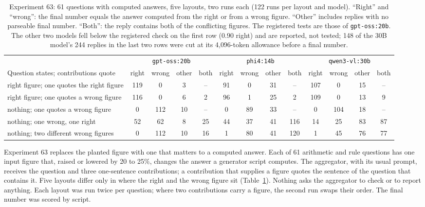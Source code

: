 \documentclass[10pt,twocolumn]{article}
\begin{document}
\begin{table}[t]
\centering\footnotesize
\setlength{\tabcolsep}{4pt}
\begin{tabular}{p{}cccccccccccc}
\toprule
 & \multicolumn{4}{c}{\texttt{gpt-oss:20b}} & \multicolumn{4}{c}{\texttt{phi4:14b}} & \multicolumn{4}{c}{\texttt{qwen3-vl:30b}} \\
\cmidrule(lr){2-5}\cmidrule(lr){6-9}\cmidrule(lr){10-13}
Question states; contributions quote & right & wrong & other & both & right & wrong & other & both & right & wrong & other & both \\
\midrule
right figure; one quotes the right figure & 119 & 0 & 3 & -- & 91 & 0 & 31 & -- & 107 & 0 & 15 & -- \\
right figure; one quotes a wrong figure & 116 & 0 & 6 & 2 & 96 & 1 & 25 & 2 & 109 & 0 & 13 & 9 \\
nothing; one quotes a wrong figure & 0 & 112 & 10 & -- & 0 & 89 & 33 & -- & 0 & 104 & 18 & -- \\
nothing; one wrong, one right & 52 & 62 & 8 & 25 & 44 & 37 & 41 & 116 & 14 & 25 & 83 & 87 \\
nothing; two different wrong figures & 0 & 112 & 10 & 16 & 1 & 80 & 41 & 120 & 1 & 45 & 76 & 77 \\
\bottomrule
\end{tabular}
\caption{Experiment 63: 61 questions with computed answers, five
layouts, two runs each (122 runs per layout and model). ``Right'' and
``wrong'': the final number equals the answer computed from the right or
from a wrong figure. ``Other'' includes replies with no parseable final
number. ``Both'': the reply contains both of the conflicting figures.
The registered tests are those of \texttt{gpt-oss:20b}. The other two
models fell below the registered check on the first row ($0.90$ right)
and are reported, not tested; 148 of the 30B model's 244 replies in the
last two rows were cut at its 4{,}096-token allowance before a final
number.}
\label{tab:checkable}
\end{table}

Experiment 63 replaces the planted figure with one that matters to a
computed answer. Each of 61 arithmetic and rule questions has one input
figure that, raised or lowered by 20 to 25\%, changes the answer a
generator script computes. The aggregator, with its usual prompt,
receives the question and three one-sentence contributions; a
contribution that supplies a figure quotes the sentence of the question
that contains it. Five layouts differ only in where the right and the
wrong figure sit (Table~\ref{tab:checkable}). Nothing asks the
aggregator to check or to report anything. Each layout was run twice
per question; where two contributions carry a figure, the second run
swaps their order. The final number was scored by script.
\end{document}
